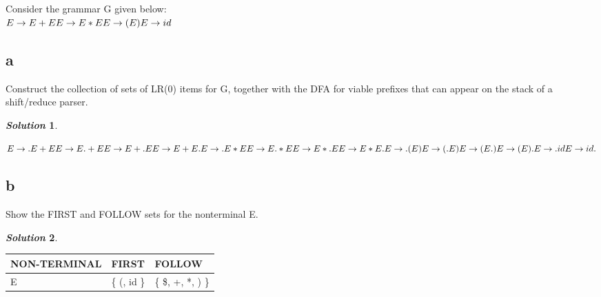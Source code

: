 \documentclass[11pt, a4paper]{article}
\newtheorem*{solution}{\emph{Solution}}
\begin{document}
\section{}
	Consider the grammar G given below:\\
	$
	E \rightarrow E+E\\
	E \rightarrow E*E\\
	E \rightarrow ( E )\\
	E \rightarrow id\\
	$
\subsection*{a}
	Construct the collection of sets of LR(0) items for G, together with the DFA for viable prefixes that can appear on the stack of a shift/reduce parser.
	\begin{solution}
	\end{solution}
	$
	E \rightarrow . E + E\\
	E \rightarrow E.+E\\
	E \rightarrow E+.E\\
	E \rightarrow E+E.\\
	E \rightarrow .E*E\\
	E \rightarrow E.*E\\
	E \rightarrow E*.E\\
	E \rightarrow E*E.\\
	E \rightarrow .( E )\\
	E \rightarrow (. E )\\
	E \rightarrow ( E. )\\
	E \rightarrow ( E ).\\
	E \rightarrow .id\\
	E \rightarrow id.\\
	$

\subsection*{b}
	Show the FIRST and FOLLOW sets for the nonterminal E.
	\begin{solution}
	\end{solution}
	\begin{tabular}{|l|l|l|}
	\hline
	NON-TERMINAL & FIRST & FOLLOW\\
	\hline
	E & \{ (, id \} & \{ \$, +, *, ) \}\\
	\hline
	\end{tabular}
\end{document}
